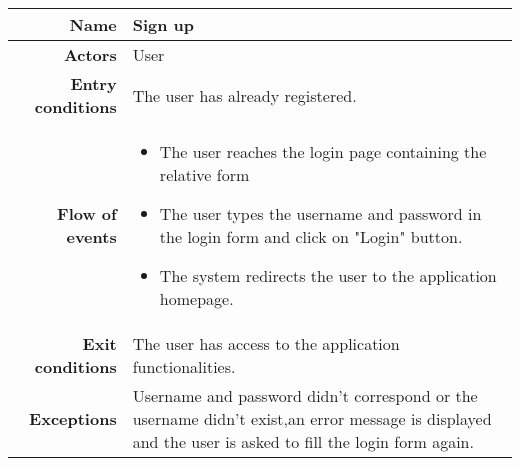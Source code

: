 \begin{center}
\begin{tabular}{r|p{7cm}}
\bf\large Name&\bf\large Sign up\\
\hline
\hline
\bf Actors&User\\
\hline
\bf Entry conditions&The user has already registered.\\
\hline
\bf Flow of events&
\begin{itemize}
\item The user reaches the login page containing the relative form
\item The user types the username and password in the login form and click on "Login" button.
\item The system redirects the user to the application homepage.
\end{itemize}
\\
\hline
\bf Exit conditions&The user has access to the application functionalities. \\
\hline
\bf Exceptions&Username and password didn't correspond or the username didn't exist,an error message is displayed and the user is asked to fill the login form again.\\
\hline

\end{tabular}
\end{center}